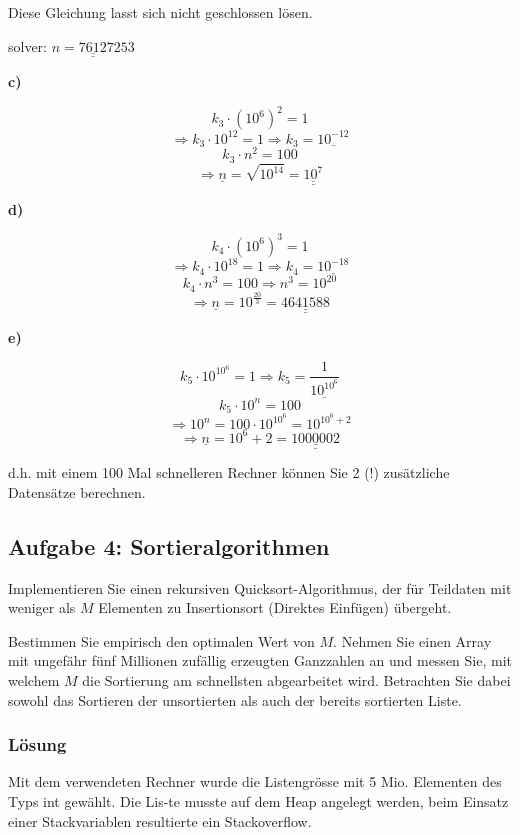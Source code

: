Diese Gleichung lasst sich nicht geschlossen lösen.

solver: $\underline{\underline{n= 76 127 253}}$

\medskip

\noindent
\textbf{c)}
\medskip

$$ k_3 \cdot (10^6)^2 = 1 $$
$$\Rightarrow k_3 \cdot 10^12 = 1 \Rightarrow k_3 = \underline{10^{-12}}$$
$$k_3 \cdot n^2 = 100$$
$$\Rightarrow \underline{n} = \sqrt{10^{14}} = \underline{\underline{10^7}}$$
\medskip

\noindent
\textbf{d)}
\medskip

$$ k_4\cdot (10^6)^3 = 1$$
$$ \Rightarrow k_4 \cdot 10^{18} =1 \Rightarrow k_4 = \underline{10^{-18}}$$
$$ k_4 \cdot n^3 = 100 \Rightarrow n^3 = 10^{20}$$
$$ \Rightarrow \underline{n} = 10^{\frac{20}{3}} = \underline{\underline{4641588}}$$
\medskip

\noindent
\textbf{e)}
\medskip
\medskip

$$ k_5 \cdot 10^{10^6} = 1 \Rightarrow k_5 = \underline{\frac{1}{10^{10^6}}}$$
$$ k_5 \cdot 10^{n} = 100$$
$$ \Rightarrow 10^n = 100 \cdot  10^{10^6} =  10^{10^6+2}$$
$$ \Rightarrow \underline{n} = 10^{6} + 2 = \underline{\underline{1000002}}$$

\medskip

d.h. mit einem 100 Mal schnelleren Rechner können Sie 2 (!) zusätzliche Datensätze berechnen.


\onecolumn

\subsection{Aufgabe 4: Sortieralgorithmen}
Implementieren Sie einen rekursiven Quicksort-Algorithmus, der für Teildaten mit weniger als $M$ Elementen
zu Insertionsort (Direktes Einfügen) übergeht.

Bestimmen Sie empirisch den optimalen Wert von $M$. Nehmen Sie einen Array mit ungefähr fünf Millionen
zufällig erzeugten Ganzzahlen an und messen Sie, mit welchem $M$ die Sortierung am schnellsten abgearbeitet
wird. Betrachten Sie dabei sowohl das Sortieren der unsortierten als auch der bereits sortierten Liste.



\subsubsection{Lösung}

Mit dem verwendeten Rechner wurde die Listengrösse mit 5 Mio. Elementen des Typs int gewählt. Die Lis-te musste auf dem Heap angelegt werden, beim Einsatz einer Stackvariablen resultierte ein Stackoverflow.

